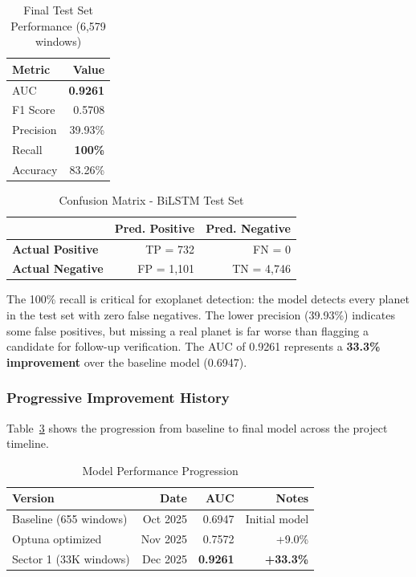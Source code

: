 \documentclass[letterpaper]{article} %
\begin{document}
\begin{table}[h]
    \centering
    \caption{Final Test Set Performance (6,579 windows)}
    \label{tab:final_test_results}
    \begin{tabular}{@{}lr@{}}
        \toprule
        \textbf{Metric} & \textbf{Value} \\
        \midrule
        AUC & \textbf{0.9261} \\
        F1 Score & 0.5708 \\
        Precision & 39.93\% \\
        Recall & \textbf{100\%} \\
        Accuracy & 83.26\% \\
        \bottomrule
    \end{tabular}
\end{table}

\begin{table}[h]
    \centering
    \caption{Confusion Matrix - BiLSTM Test Set}
    \label{tab:confusion_matrix_rnn}
    \begin{tabular}{@{}lrr@{}}
        \toprule
         & \textbf{Pred. Positive} & \textbf{Pred. Negative} \\
        \midrule
        \textbf{Actual Positive} & TP = 732 & FN = 0 \\
        \textbf{Actual Negative} & FP = 1,101 & TN = 4,746 \\
        \bottomrule
    \end{tabular}
\end{table}

The 100\% recall is critical for exoplanet detection: the model detects every planet in the test set with zero false negatives. The lower precision (39.93\%) indicates some false positives, but missing a real planet is far worse than flagging a candidate for follow-up verification. The AUC of 0.9261 represents a \textbf{33.3\% improvement} over the baseline model (0.6947).

\subsubsection{Progressive Improvement History}

Table~\ref{tab:optimization_results} shows the progression from baseline to final model across the project timeline.

\begin{table}[h]
    \centering
    \caption{Model Performance Progression}
    \label{tab:optimization_results}
    \begin{tabular}{@{}lrrr@{}}
        \toprule
        \textbf{Version} & \textbf{Date} & \textbf{AUC} & \textbf{Notes} \\
        \midrule
        Baseline (655 windows) & Oct 2025 & 0.6947 & Initial model \\
        Optuna optimized & Nov 2025 & 0.7572 & +9.0\% \\
        Sector 1 (33K windows) & Dec 2025 & \textbf{0.9261} & \textbf{+33.3\%} \\
        \bottomrule
    \end{tabular}
\end{table}
\end{document}
